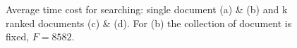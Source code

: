 \documentclass[sigconf,pdftex]{acmart}
\begin{document}
\begin{figure}[!t]
    \centering
    \hfill


    \hfill
  \caption{\small{Average time cost for searching: single document (a) \& (b) and k ranked documents (c) \& (d). For (b) the collection of document is fixed, $F= 8582$.}}
  \label{fig:ranked}
\end{figure}
\end{document}
